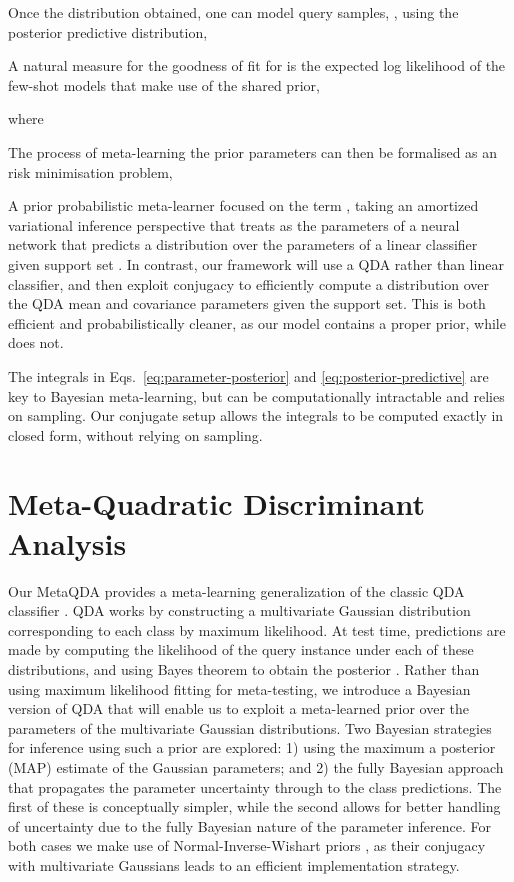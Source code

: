\documentclass[10pt,twocolumn,letterpaper]{article}
\begin{document}
Once the distribution obtained, one can model query samples, , using the posterior predictive distribution,

A natural measure for the goodness of fit for  is the expected log likelihood of the few-shot models that make use of the shared prior,

where

The process of meta-learning the prior parameters can then be formalised as an risk minimisation problem,


 A prior probabilistic meta-learner \cite{gordon2019metaPred} focused on the term , taking an amortized variational inference perspective that treats  as the parameters of a neural network that predicts a distribution over the parameters  of a linear classifier given support set . In contrast, our framework will use a QDA rather than linear classifier, and then exploit conjugacy to efficiently compute a distribution over the QDA mean and covariance parameters  given the support set. This is both efficient and probabilistically cleaner, as our model contains a proper prior, while \cite{gordon2019metaPred}  does not.

The integrals in Eqs.~\ref{eq:parameter-posterior} and \ref{eq:posterior-predictive} are key to Bayesian meta-learning, but can be computationally intractable and \cite{gordon2019metaPred} relies on sampling. Our conjugate setup allows the integrals to be computed exactly in closed form, without relying on sampling. 

\section{Meta-Quadratic Discriminant Analysis}
Our MetaQDA provides a meta-learning generalization of the classic QDA classifier \cite{hastie2009elements}. QDA works by constructing a multivariate Gaussian distribution  corresponding to each class by maximum likelihood. At test time, predictions are made by computing the likelihood of the query instance under each of these distributions, and using Bayes theorem to obtain the posterior . 
Rather than using maximum likelihood fitting for meta-testing, we introduce a Bayesian version of QDA that will enable us to exploit a meta-learned prior over the parameters of the multivariate Gaussian distributions.
Two Bayesian strategies for inference using such a prior are explored: 1) using the maximum a posterior (MAP) estimate of the Gaussian parameters; and 2) the fully Bayesian approach that propagates the parameter uncertainty through to the class predictions. The first of these is conceptually simpler, while the second allows for better handling of uncertainty due to the fully Bayesian nature of the parameter inference. For both cases we make use of Normal-Inverse-Wishart priors \cite{gelman2003bda}, as their conjugacy with multivariate Gaussians leads to an efficient implementation strategy. 
\end{document}
